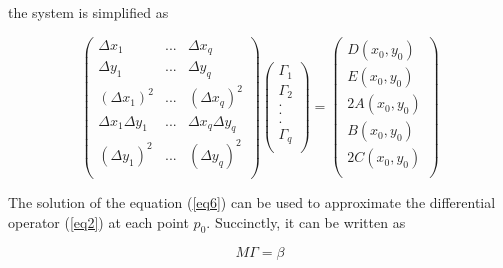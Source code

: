 \documentclass[a4paper,fleqn]{cas-sc}
\begin{document}
the system is simplified as

\begin{equation}\label{eq6}
\left(
\begin{array}{clcl}
\Delta x_1 &... &\Delta x_q\\
\Delta y_1 &... &\Delta y_q\\
(\Delta x_1)^2 &... &(\Delta x_q)^2\\
\Delta x_1\Delta y_1 &... &\Delta x_q\Delta y_q\\
(\Delta y_1)^2 &... &(\Delta y_q)^2\\
\end{array}
\right)
\left(
\begin{array}{lclcl}
\Gamma_1\\
\Gamma_2\\
.\\
.\\
.\\
\Gamma_q\\
\end{array}
\right)=
\left(
\begin{array}{rclcl}
D(x_0,y_0)\\
E(x_0,y_0)\\
2A(x_0,y_0)\\
B(x_0,y_0)\\
2C(x_0,y_0)\\
\end{array}
\right)
\end{equation}

The solution of the equation (\ref{eq6}) can be used to approximate the differential operator (\ref{eq2}) at each point $p_0$. Succinctly, it can be written as

\begin{equation}\label{eq7}
M \Gamma= \beta
\end{equation}
\end{document}
